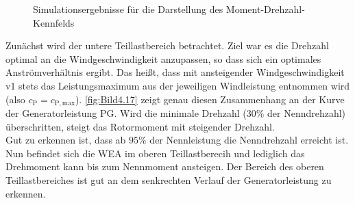\begin{figure}[H]
   \centering
   \caption[Simulation des Moment-Drehzahl-Kennfelds]{Simulationsergebnisse für die Darstellung des Moment-Drehzahl-Kennfelds}
   \label{fig:Bild4.17}
\end{figure}
Zunächst wird der untere Teillastbereich betrachtet. Ziel war es die Drehzahl optimal an die Windgeschwindigkeit anzupassen, so dass sich ein optimales Anströmverhältnis ergibt. Das heißt, dass mit ansteigender Windgeschwindigkeit \acs{v1} stets das Leistungsmaximum aus der jeweiligen Windleistung entnommen wird (also $c_{\mathrm{P}} = c_{\mathrm{P,max}}$). \autoref{fig:Bild4.17} zeigt genau diesen Zusammenhang an der Kurve der Generatorleistung \acs{PG}. Wird die minimale Drehzahl ($30\%$ der Nenndrehzahl) überschritten, steigt das Rotormoment mit steigender Drehzahl.\\
Gut zu erkennen ist, dass ab $95\%$ der Nennleistung die Nenndrehzahl erreicht ist. Nun befindet sich die WEA im oberen Teillastberecih und lediglich das Drehmoment kann bis zum Nennmoment ansteigen. Der Bereich des oberen Teillastbereiches ist gut an dem senkrechten Verlauf der Generatorleistung zu erkennen.\\

